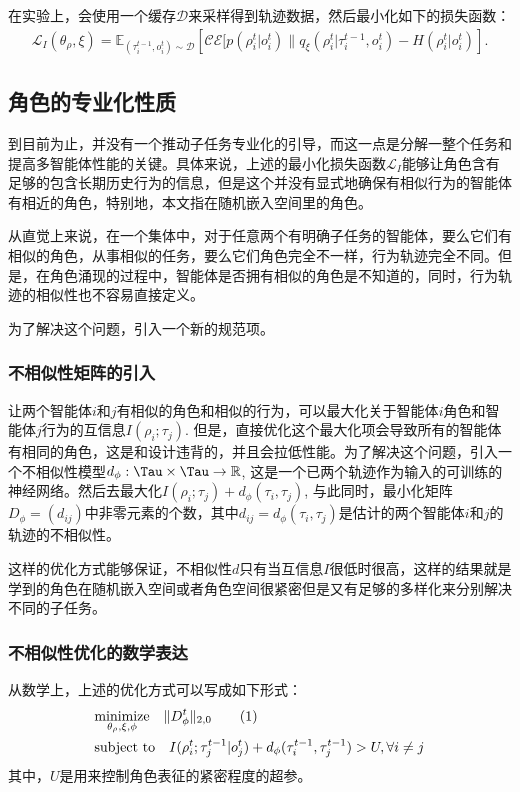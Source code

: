 在实验上，会使用一个缓存$\mathcal{D}$来采样得到轨迹数据，然后最小化如下的损失函数：
\begin{equation}
    \begin{aligned}
        \mathcal{L}_I(\theta_\rho, \xi) = \mathbb{E}_{(\tau^{t-1}_i, o^t_i)\sim\mathcal{D}}\left[\mathcal{CE}[p(\rho^t_i | o^t_i) \| q_\xi(\rho^t_i | \tau^{t-1}_i, o^t_i) - H(\rho_i^t | o_i^t)\right].
    \end{aligned}
\end{equation}

\subsection{角色的专业化性质}
到目前为止，并没有一个推动子任务专业化的引导，而这一点是分解一整个任务和提高多智能体性能的关键。具体来说，上述的最小化损失函数$\mathcal{L}_I$能够让角色含有足够的包含长期历史行为的信息，但是这个并没有显式地确保有相似行为的智能体有相近的角色，特别地，本文指在随机嵌入空间里的角色。

从直觉上来说，在一个集体中，对于任意两个有明确子任务的智能体，要么它们有相似的角色，从事相似的任务，要么它们角色完全不一样，行为轨迹完全不同。但是，在角色涌现的过程中，智能体是否拥有相似的角色是不知道的，同时，行为轨迹的相似性也不容易直接定义。

为了解决这个问题，引入一个新的规范项。

\subsubsection{不相似性矩阵的引入}
让两个智能体$i$和$j$有相似的角色和相似的行为，可以最大化关于智能体$i$角色和智能体$j$行为的互信息$I(\rho_i; \tau_j)$. 但是，直接优化这个最大化项会导致所有的智能体有相同的角色，这是和设计违背的，并且会拉低性能。为了解决这个问题，引入一个不相似性模型$d_{\phi}: \Tau\times\Tau\rightarrow\mathbb{R}$, 这是一个已两个轨迹作为输入的可训练的神经网络。然后去最大化$I(\rho_i; \tau_j) + d_\phi(\tau_i, \tau_j)$, 与此同时，最小化矩阵$D_\phi=(d_{ij})$中非零元素的个数，其中$d_{ij}=d_\phi(\tau_i, \tau_j)$是估计的两个智能体$i$和$j$的轨迹的不相似性。

这样的优化方式能够保证，不相似性$d$只有当互信息$I$很低时很高，这样的结果就是学到的角色在随机嵌入空间或者角色空间很紧密但是又有足够的多样化来分别解决不同的子任务。

\subsubsection{不相似性优化的数学表达}
从数学上，上述的优化方式可以写成如下形式：
\begin{align*}
    &\underset{{\theta_\rho, \xi, \phi}}{\text{minimize}} \ \ \ \|D_\phi^t\|_{2,0} \stepcounter{equation}\tag{\theequation} \\
    &\text{subject to} \ \ \ I(\rho^{t}_i; \tau^{t-1}_j|o^t_j) + d_\phi(\tau^{t-1}_i, \tau^{t-1}_j) > U, \forall i\ne j
\end{align*}
其中，$U$是用来控制角色表征的紧密程度的超参。

